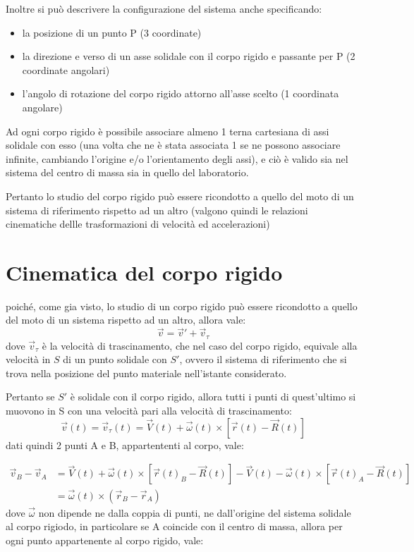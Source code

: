 \documentclass[11pt, a4paper, openright]{book}
\theoremstyle{plain}
\theoremstyle{definition}
\begin{document}
Inoltre si può descrivere la configurazione del sistema anche specificando:
\begin{itemize}
    \item la posizione di un punto P (3 coordinate)
    \item la direzione e verso di un asse solidale con il corpo rigido e passante per P (2 coordinate angolari)
    \item l'angolo di rotazione del corpo rigido attorno all'asse scelto (1 coordinata angolare)
\end{itemize}
Ad ogni corpo rigido è possibile associare almeno 1 terna cartesiana di assi solidale con esso (una volta che ne è stata associata 1 se ne possono associare infinite, cambiando l'origine e/o l'orientamento degli assi), e ciò è valido sia nel sistema del centro di massa sia in quello del laboratorio.

Pertanto lo studio del corpo rigido può essere ricondotto a quello del moto di un sistema di riferimento rispetto ad un altro (valgono quindi le relazioni cinematiche dellle trasformazioni di velocità ed accelerazioni)

\section{Cinematica del corpo rigido}
poiché, come gia visto, lo studio di un corpo rigido può essere ricondotto a quello del moto di un sistema rispetto ad un altro, allora vale:
\begin{equation}
    \vec{v} = \vec{v}' + \vec{v}_\tau
\end{equation}
dove $\vec{v}_\tau$ è la velocità di trascinamento, che nel caso del corpo rigido, equivale alla velocità in $S$ di un punto solidale con $S'$, ovvero il sistema di riferimento che si trova nella posizione del punto materiale nell'istante considerato.

Pertanto se $S'$ è solidale con il corpo rigido, allora tutti i punti di quest'ultimo si muovono in S con una velocità pari alla velocità di trascinamento:
\[\vec{v}(t) = \vec{v}_\tau(t) = \vec{V}(t) + \vec{\omega}(t) \times [\vec{r}(t) - \vec{R}(t)]\]
dati quindi 2 punti A e B, appartententi al corpo, vale:

\begin{align}
    \vec{v}_B - \vec{v}_A & = \vec{V}(t) + \vec{\omega}(t) \times [\vec{r}(t)_B - \vec{R}(t)] - \vec{V}(t) - \vec{\omega}(t) \times [\vec{r}(t)_A - \vec{R}(t)] \\
    & = \vec{\omega}(t) \times (\vec{r}_B - \vec{r}_A)    
\end{align}
dove $\vec{\omega}$ non dipende ne dalla coppia di punti, ne dall'origine del sistema solidale al corpo rigiodo, in particolare se A coincide con il centro di massa, allora per ogni punto appartenente al corpo rigido, vale:
\end{document}
